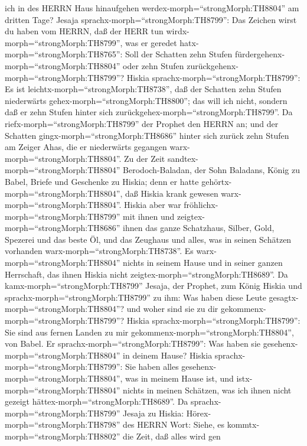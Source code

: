 ich in des HERRN Haus hinaufgehen werdex-morph=``strongMorph:TH8804'' am
dritten Tage?  Jesaja sprachx-morph=``strongMorph:TH8799'':
Das Zeichen wirst du haben vom HERRN, daß der HERR tun
wirdx-morph=``strongMorph:TH8799'', was er geredet
hatx-morph=``strongMorph:TH8765'': Soll der Schatten zehn Stufen
fürdergehenx-morph=``strongMorph:TH8804'' oder zehn Stufen
zurückgehenx-morph=``strongMorph:TH8799''?  Hiskia
sprachx-morph=``strongMorph:TH8799'': Es ist
leichtx-morph=``strongMorph:TH8738'', daß der Schatten zehn Stufen
niederwärts gehex-morph=``strongMorph:TH8800''; das will ich nicht,
sondern daß er zehn Stufen hinter sich
zurückgehex-morph=``strongMorph:TH8799''.  Da
riefx-morph=``strongMorph:TH8799'' der Prophet den HERRN an; und der
Schatten gingx-morph=``strongMorph:TH8686'' hinter sich zurück zehn
Stufen am Zeiger Ahas, die er niederwärts gegangen
warx-morph=``strongMorph:TH8804''.  Zu der Zeit
sandtex-morph=``strongMorph:TH8804'' Berodoch-Baladan, der Sohn
Baladans, König zu Babel, Briefe und Geschenke zu Hiskia; denn er hatte
gehörtx-morph=``strongMorph:TH8804'', daß Hiskia krank gewesen
warx-morph=``strongMorph:TH8804''.  Hiskia aber war
fröhlichx-morph=``strongMorph:TH8799'' mit ihnen und
zeigtex-morph=``strongMorph:TH8686'' ihnen das ganze Schatzhaus, Silber,
Gold, Spezerei und das beste Öl, und das Zeughaus und alles, was in
seinen Schätzen vorhanden warx-morph=``strongMorph:TH8738''. Es
warx-morph=``strongMorph:TH8804'' nichts in seinem Hause und in seiner
ganzen Herrschaft, das ihnen Hiskia nicht
zeigtex-morph=``strongMorph:TH8689''.  Da
kamx-morph=``strongMorph:TH8799'' Jesaja, der Prophet, zum König Hiskia
und sprachx-morph=``strongMorph:TH8799'' zu ihm: Was haben diese Leute
gesagtx-morph=``strongMorph:TH8804''? und woher sind sie zu dir
gekommenx-morph=``strongMorph:TH8799''? Hiskia
sprachx-morph=``strongMorph:TH8799'': Sie sind aus fernen Landen zu mir
gekommenx-morph=``strongMorph:TH8804'', von Babel.  Er
sprachx-morph=``strongMorph:TH8799'': Was haben sie
gesehenx-morph=``strongMorph:TH8804'' in deinem Hause? Hiskia
sprachx-morph=``strongMorph:TH8799'': Sie haben alles
gesehenx-morph=``strongMorph:TH8804'', was in meinem Hause ist, und
istx-morph=``strongMorph:TH8804'' nichts in meinen Schätzen, was ich
ihnen nicht gezeigt hättex-morph=``strongMorph:TH8689''. 
Da sprachx-morph=``strongMorph:TH8799'' Jesaja zu Hiskia:
Hörex-morph=``strongMorph:TH8798'' des HERRN Wort:  Siehe,
es kommtx-morph=``strongMorph:TH8802'' die Zeit, daß alles wird gen
